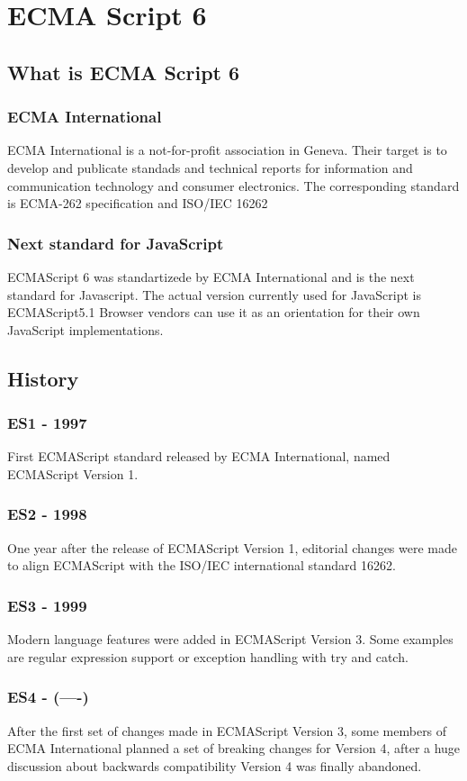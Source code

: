 \documentclass{bioinfo}
\begin{document}
\section{ECMA Script 6}
\subsection{What is ECMA Script 6}
\subsubsection{ECMA International}
ECMA International is a not-for-profit association in Geneva. Their target is
to develop and publicate standads and technical reports for information and
communication technology and consumer electronics. 
The corresponding standard is ECMA-262 specification and ISO/IEC 16262
\subsubsection{Next standard for JavaScript}
ECMAScript 6 was standartizede by ECMA International and is the next standard
for Javascript. The actual version currently used for JavaScript is ECMAScript5.1
Browser vendors can use it as an orientation for their own JavaScript implementations.

\subsection{History}
\subsubsection*{\textbf{ES1 - 1997}}
First ECMAScript standard released by ECMA International, named ECMAScript Version 1.
\subsubsection*{\textbf{ES2 - 1998}}
One year after the release of ECMAScript Version 1, editorial changes were made to align ECMAScript with the ISO/IEC international standard 16262.
\subsubsection*{\textbf{ES3 - 1999}}
Modern language features were added in ECMAScript Version 3. Some examples are regular expression support or exception handling with try and catch.
\subsubsection*{\textbf{ES4 - (----)}}After the first set of changes made in ECMAScript Version 3, some members of ECMA International planned a set of breaking changes for Version 4, after a huge discussion about backwards compatibility Version 4 was finally abandoned.
\end{document}
